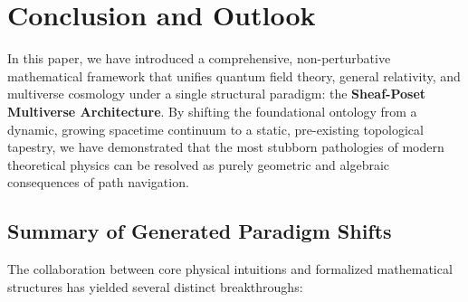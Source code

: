 \documentclass[12pt,letterpaper]{article}
\begin{document}
\section{Conclusion and Outlook}

In this paper, we have introduced a comprehensive, non-perturbative mathematical framework that unifies quantum field theory, general relativity, and multiverse cosmology under a single structural paradigm: the \textbf{Sheaf-Poset Multiverse Architecture}. By shifting the foundational ontology from a dynamic, growing spacetime continuum to a static, pre-existing topological tapestry, we have demonstrated that the most stubborn pathologies of modern theoretical physics can be resolved as purely geometric and algebraic consequences of path navigation.

\subsection{Summary of Generated Paradigm Shifts}
The collaboration between core physical intuitions and formalized mathematical structures has yielded several distinct breakthroughs:
\end{document}
